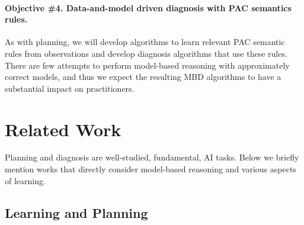 \documentclass[12pt]{article}
\newcommand{\note}[1]{\textbf{\textit{#1}}}
\begin{document}
\paragraph{Objective \#4. Data-and-model driven diagnosis with PAC semantics rules.} 
As with planning, we will develop algorithms to learn 
relevant PAC semantic rules from observations and develop diagnosis algorithms that use these rules. There are few attempts to perform model-based reasoning with approximately correct models, and thus we expect the resulting MBD algorithms to have a substantial impact on practitioners.  









\section{Related Work}
Planning and diagnosis are well-studied, fundamental, AI tasks. 
Below we briefly mention works that directly consider model-based reasoning and various aspects of learning. 

\subsection{Learning and Planning}
\end{document}
